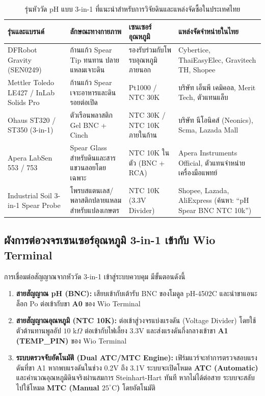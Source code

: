 \documentclass[12pt,a4paper,oneside]{report}
\begin{document}
\begin{table}[htbp]
\centering
\caption{รุ่นหัววัด pH แบบ 3-in-1 ที่แนะนำสำหรับการวิจัยดินและแหล่งจัดซื้อในประเทศไทย}
\label{tab:probe_sources}
\begin{tabularx}{\textwidth}{p{3.8cm}p{3.5cm}p{3.2cm}Y}
\toprule
\textbf{รุ่นและแบรนด์} & \textbf{ลักษณะทางกายภาพ} & \textbf{เซนเซอร์อุณหภูมิ} & \textbf{แหล่งจัดจำหน่ายในไทย} \\
\midrule
DFRobot Gravity (SEN0249) & ก้านแก้ว Spear Tip ทนทาน ปลายแหลมเจาะดิน & รองรับร่วมกับโพรบอุณหภูมิภายนอก & Cybertice, ThaiEasyElec, Gravitech TH, Shopee \\
Mettler Toledo LE427 / InLab Solids Pro & ก้านแก้ว Spear เจาะอาหารและดิน รอยต่อเปิด & Pt1000 / NTC 30K & บริษัท เอ็นพี เคมิคอล, Merit Tech, ตัวแทนแล็บ \\
Ohaus ST320 / ST350 (3-in-1) & ตัวเรือนพลาสติก Gel BNC + Cinch & NTC 30K / NTC 10K ภายในก้าน & บริษัท นีโอนิคส์ (Neonics), Scma, Lazada Mall \\
Apera LabSen 553 / 753 & Spear Glass สำหรับดินและสารแขวนลอยโดยเฉพาะ & NTC 10K ในตัว (BNC + RCA) & Apera Instruments Official, ตัวแทนจำหน่ายเครื่องมือแพทย์ \\
Industrial Soil 3-in-1 Spear Probe & โพรบสแตนเลส/พลาสติกปลายแหลมสำหรับแปลงเกษตร & NTC 10K (3.3V Divider) & Shopee, Lazada, AliExpress (ค้นหา: ``pH Spear BNC NTC 10k'') \\
\bottomrule
\end{tabularx}
\end{table}

\subsection{ผังการต่อวงจรเซนเซอร์อุณหภูมิ 3-in-1 เข้ากับ Wio Terminal}
การเชื่อมต่อสัญญาณจากหัววัด 3-in-1 เข้าสู่ระบบควบคุม มีขั้นตอนดังนี้
\begin{enumerate}
    \item \textbf{สายสัญญาณ pH (BNC):} เสียบเข้ากับเต้ารับ BNC ของโมดูล pH-4502C และนำขาแอนะล็อก Po ต่อเข้ากับขา \textbf{A0} ของ Wio Terminal
    \item \textbf{สายสัญญาณอุณหภูมิ (NTC 10K):} ต่อเข้าสู่วงจรแบ่งแรงดัน (Voltage Divider) โดยใช้ตัวต้านทานพูลอัป $10\text{ k}\Omega$ ต่อเข้ากับไฟเลี้ยง 3.3V และส่งแรงดันกึ่งกลางเข้าขา \textbf{A1 (TEMP\_PIN)} ของ Wio Terminal
    \item \textbf{ระบบตรวจจับอัตโนมัติ (Dual ATC/MTC Engine):} เฟิร์มแวร์จะทำการตรวจสอบแรงดันที่ขา A1 หากพบแรงดันในช่วง 0.2V ถึง 3.1V ระบบจะเปิดโหมด \textbf{ATC (Automatic)} และคำนวณอุณหภูมิดินจริงผ่านสมการ Steinhart-Hart ทันที หากไม่ได้ต่อสาย ระบบจะสลับไปใช้โหมด \textbf{MTC (Manual $25^\circ\text{C}$)} โดยอัตโนมัติ
\end{enumerate}
\end{document}
